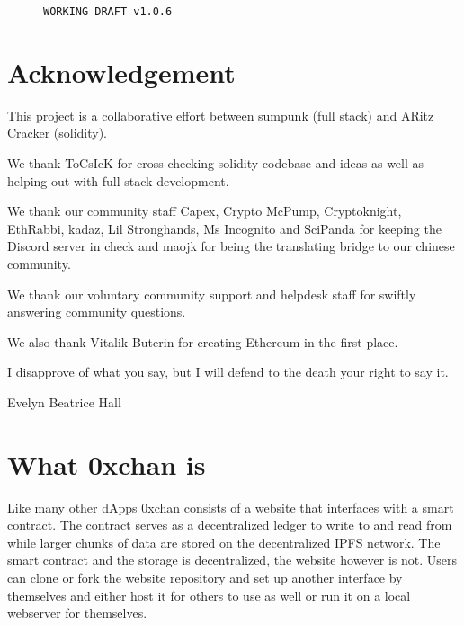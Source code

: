 \documentclass[a4paper]{article}
\title{\projectname}
\author{
  sumpunk\\
  \texttt{sumpunk@protonmail.com}
  \and
  ARitz Cracker\\
  \texttt{aritz@aritzcracker.ca}
}
\newcommand{\projectname}{0xchan}
\begin{document}
\maketitle

\begin{figure}[H]
    \centering
    \texttt{WORKING DRAFT v1.0.6}

\end{figure}

\begin{abstract}
\projectname{} is a decentralized and immutable message board system on the Ethereum blockchain where users can post messages and media files. Storage of those messages is handled via IPFS and a smart contract is used to store a ledger of all messages. A Proof of Stake style mechanism ensures quality content and protects the system against spam, while also incentivising users to stake their Ether. The immutable and decentralized nature of the system allows for free speech and gives way to create truly censorship resistant and self sustaining platforms.

\end{abstract}

\section*{Acknowledgement}
This project is a collaborative effort between sumpunk (full stack) and ARitz Cracker (solidity). 

We thank ToCsIcK for cross-checking solidity codebase and ideas as well as helping out with full stack development.

We thank our community staff Capex, Crypto McPump, Cryptoknight, EthRabbi, kadaz, Lil Stronghands, Ms Incognito and SciPanda for keeping the Discord server in check and maojk for being the translating bridge to our chinese community.

We thank our voluntary community support and helpdesk staff for swiftly answering community questions.

We also thank Vitalik Buterin for creating Ethereum in the first place.

\vspace*{\fill}
\epigraph{I disapprove of what you say, but I will defend to the death your right to say it.}{Evelyn Beatrice Hall}

\pagebreak

\section{What \projectname{} is}
Like many other dApps \projectname{} consists of a website that interfaces with a smart contract. The contract serves as a decentralized ledger to write to and read from while larger chunks of data are stored on the decentralized IPFS network. The smart contract and the storage is decentralized, the website however is not. Users can clone or fork the website repository and set up another interface by themselves and either host it for others to use as well or run it on a local webserver for themselves.
\end{document}
